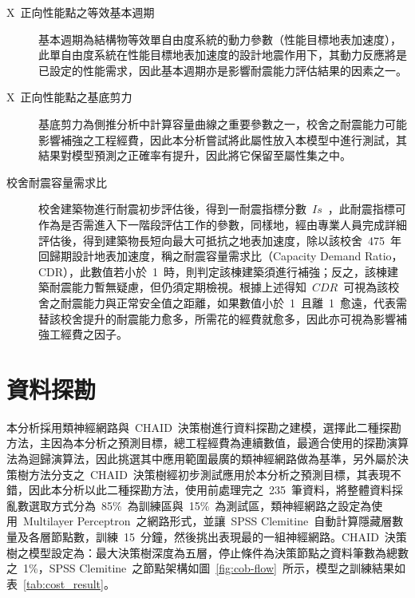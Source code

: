 \begin{description}
  \item[X~正向性能點之等效基本週期]
  \cite{ncree09015}基本週期為結構物等效單自由度系統的動力參數（性能目標地表加速度），此單自由度系統在性能目標地表加速度的設計地震作用下，其動力反應將是已設定的性能需求，因此基本週期亦是影響耐震能力評估結果的因素之一。
  \item[X~正向性能點之基底剪力]
  基底剪力為側推分析中計算容量曲線之重要參數之一，校舍之耐震能力可能影響補強之工程經費，因此本分析嘗試將此屬性放入本模型中進行測試，其結果對模型預測之正確率有提升，因此將它保留至屬性集之中。
  \item[校舍耐震容量需求比]
  \cite{ncree09026}校舍建築物進行耐震初步評估後，得到一耐震指標分數~$Is$~，此耐震指標可作為是否需進入下一階段評估工作的參數，同樣地，經由專業人員完成詳細評估後，得到建築物長短向最大可抵抗之地表加速度，除以該校舍~475~年回歸期設計地表加速度，稱之耐震容量需求比（Capacity Demand Ratio，CDR），此數值若小於~1~時，則判定該棟建築須進行補強；反之，該棟建築耐震能力暫無疑慮，但仍須定期檢視。根據上述得知~$CDR$~可視為該校舍之耐震能力與正常安全值之距離，如果數值小於~1~且離~1~愈遠，代表需替該校舍提升的耐震能力愈多，所需花的經費就愈多，因此亦可視為影響補強工經費之因子。
\end{description}

\section{資料探勘}

本分析採用類神經網路與~CHAID~決策樹進行資料探勘之建模，選擇此二種探勘方法，主因為本分析之預測目標，總工程經費為連續數值，最適合使用的探勘演算法為迴歸演算法，因此挑選其中應用範圍最廣的類神經網路做為基準，另外屬於決策樹方法分支之~CHAID~決策樹經初步測試應用於本分析之預測目標，其表現不錯，因此本分析以此二種探勘方法，使用前處理完之~235~筆資料，將整體資料採亂數選取方式分為~85\%~為訓練區與~15\%~為測試區，類神經網路之設定為使用~Multilayer Perceptron~之網路形式，並讓~SPSS Clemitine~自動計算隱藏層數量及各層節點數，訓練~15~分鐘，然後挑出表現最的一組神經網路。CHAID~決策樹之模型設定為：最大決策樹深度為五層，停止條件為決策節點之資料筆數為總數之~1\%，SPSS Clemitine~之節點架構如圖~\ref{fig:cob-flow}~所示，模型之訓練結果如表~\ref{tab:cost_result}。

